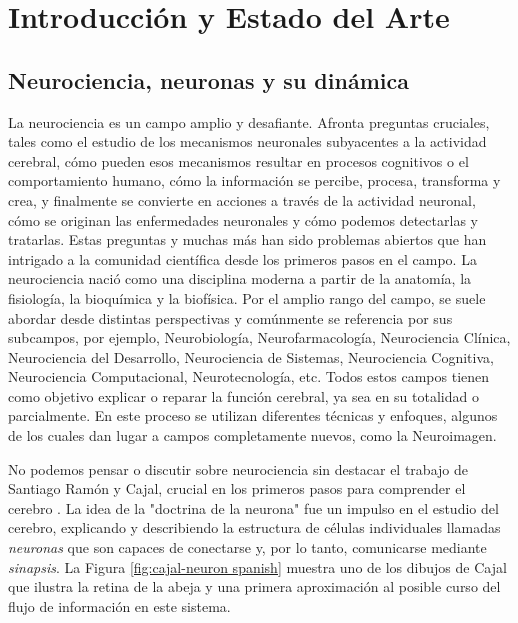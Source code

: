 \chapter{Introducción y Estado del Arte}
\label{c-intro spanish}

\section{Neurociencia, neuronas y su dinámica}
La neurociencia es un campo amplio y desafiante. Afronta preguntas cruciales, tales como el estudio de los mecanismos neuronales subyacentes a la actividad cerebral, cómo pueden esos mecanismos resultar en procesos cognitivos o el comportamiento humano, cómo la información se percibe, procesa, transforma y crea, y finalmente se convierte en acciones a través de la actividad neuronal, cómo se originan las enfermedades neuronales y cómo podemos detectarlas y tratarlas. 
Estas preguntas y muchas más han sido problemas abiertos que han intrigado a la comunidad científica desde los primeros pasos en el campo. La neurociencia nació como una disciplina moderna a partir de la anatomía, la fisiología, la bioquímica y la biofísica. Por el amplio rango del campo, se suele abordar desde distintas perspectivas y comúnmente se referencia por sus subcampos, por ejemplo, Neurobiología, Neurofarmacología, Neurociencia Clínica, Neurociencia del Desarrollo, Neurociencia de Sistemas, Neurociencia Cognitiva, Neurociencia Computacional, Neurotecnología, etc. Todos estos campos tienen como objetivo explicar o reparar la función cerebral, ya sea en su totalidad o parcialmente. En este proceso se utilizan diferentes técnicas y enfoques, algunos de los cuales dan lugar a campos completamente nuevos, como la Neuroimagen.

No podemos pensar o discutir sobre neurociencia sin destacar el trabajo de Santiago Ramón y Cajal, crucial en los primeros pasos para comprender el cerebro \parencite{ramonycajal_textura_1899,decarlos_historical_2007,decastro_editorial_2016,delgado-garcia_cajal_2015,decastro_cajal_2019}. La idea de la "doctrina de la neurona" fue un impulso en el estudio del cerebro, explicando y describiendo la estructura de células individuales llamadas \textit{neuronas} que son capaces de conectarse y, por lo tanto, comunicarse mediante \textit{sinapsis}. La Figura \ref{fig:cajal-neuron spanish} muestra uno de los dibujos de Cajal que ilustra la retina de la abeja y una primera aproximación al posible curso del flujo de información en este sistema.


